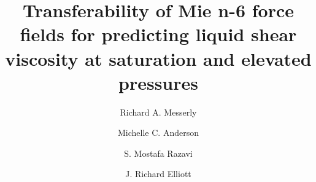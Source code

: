 \documentclass[preprint,review,12pt]{elsarticle}
\begin{document}
	
	\begin{frontmatter}
		
		
		
		\title{}
		
		\title{Transferability of Mie n-6 force fields for predicting liquid shear viscosity at saturation and elevated pressures}
		
		
		\author{Richard A. Messerly}
		\address{Thermodynamics Research Center, National Institute of Standards and Technology, Boulder, Colorado, 80305}
		
		\author{Michelle C. Anderson}
		
		\author{S. Mostafa Razavi}
		
		\author{J. Richard Elliott}
		
		

\end{frontmatter}
\end{document}
